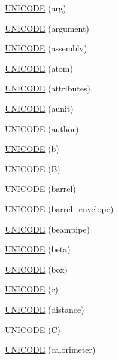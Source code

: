 \begin{DoxyCompactItemize}
\item 
\hyperlink{namespace_d_d4hep_1_1_x_m_l_a6f421944f5831041665db88a3467346b}{U\+N\+I\+C\+O\+DE} (arg)
\item 
\hyperlink{namespace_d_d4hep_1_1_x_m_l_a7ba6f4de324ae3be375b6907dd98c39b}{U\+N\+I\+C\+O\+DE} (argument)
\item 
\hyperlink{namespace_d_d4hep_1_1_x_m_l_a53fbcd748017c633abcaf6e180273bc1}{U\+N\+I\+C\+O\+DE} (assembly)
\item 
\hyperlink{namespace_d_d4hep_1_1_x_m_l_a6f10960f07e1382c095559abc0b23536}{U\+N\+I\+C\+O\+DE} (atom)
\item 
\hyperlink{namespace_d_d4hep_1_1_x_m_l_a258e796f1da5ee1741cb66066d5af397}{U\+N\+I\+C\+O\+DE} (attributes)
\item 
\hyperlink{namespace_d_d4hep_1_1_x_m_l_ae87b8e24ce2906599d9abc5418339bde}{U\+N\+I\+C\+O\+DE} (aunit)
\item 
\hyperlink{namespace_d_d4hep_1_1_x_m_l_a68cef4944649864adb3a897b82b74f46}{U\+N\+I\+C\+O\+DE} (author)
\item 
\hyperlink{namespace_d_d4hep_1_1_x_m_l_a91cdbd4403903a23fc89a3c6f8fbbc1c}{U\+N\+I\+C\+O\+DE} (b)
\item 
\hyperlink{namespace_d_d4hep_1_1_x_m_l_aa38b6117dd6cfb7f18a1d8edb53802f9}{U\+N\+I\+C\+O\+DE} (B)
\item 
\hyperlink{namespace_d_d4hep_1_1_x_m_l_acecfc39b8bd7d1ad3f913460455b8c3d}{U\+N\+I\+C\+O\+DE} (barrel)
\item 
\hyperlink{namespace_d_d4hep_1_1_x_m_l_a8a731a0f9270783f7ccc1824c93b53c9}{U\+N\+I\+C\+O\+DE} (barrel\+\_\+envelope)
\item 
\hyperlink{namespace_d_d4hep_1_1_x_m_l_a3ccbaea264dfe97079c7eca35c629545}{U\+N\+I\+C\+O\+DE} (beampipe)
\item 
\hyperlink{namespace_d_d4hep_1_1_x_m_l_a956ac5a230a79cf5d08be76044e9cf25}{U\+N\+I\+C\+O\+DE} (beta)
\item 
\hyperlink{namespace_d_d4hep_1_1_x_m_l_ab65cacab7fd28b830a5beafdf652c0f0}{U\+N\+I\+C\+O\+DE} (box)
\item 
\hyperlink{namespace_d_d4hep_1_1_x_m_l_a2710c9726bb1726142666d83be6dd910}{U\+N\+I\+C\+O\+DE} (c)
\item 
\hyperlink{namespace_d_d4hep_1_1_x_m_l_a7706bd91846ffc9a84cff5e218e2f75b}{U\+N\+I\+C\+O\+DE} (distance)
\item 
\hyperlink{namespace_d_d4hep_1_1_x_m_l_a15ba95eb2e202f6dac2762ab37e96b27}{U\+N\+I\+C\+O\+DE} (C)
\item 
\hyperlink{namespace_d_d4hep_1_1_x_m_l_a0e714fb97b896c24e059b7814d1dde51}{U\+N\+I\+C\+O\+DE} (calorimeter)

\end{DoxyCompactItemize}
